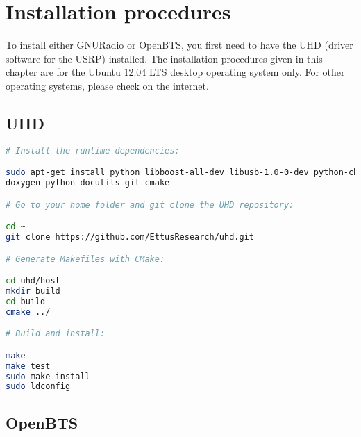 \chapter{Installation procedures}
To install either GNURadio or OpenBTS, you first need to have the UHD (driver
software for the USRP) installed. 
The installation procedures given in this chapter are for the Ubuntu 12.04 LTS
desktop operating system only. For other operating systems, please check on
the internet.
\section{UHD}
\begin{lstlisting}[language=bash]
# Install the runtime dependencies:

sudo apt-get install python libboost-all-dev libusb-1.0-0-dev python-cheetah \
doxygen python-docutils git cmake

# Go to your home folder and git clone the UHD repository:

cd ~
git clone https://github.com/EttusResearch/uhd.git

# Generate Makefiles with CMake:

cd uhd/host
mkdir build
cd build
cmake ../

# Build and install:

make
make test
sudo make install
sudo ldconfig
\end{lstlisting}


\section{OpenBTS}


